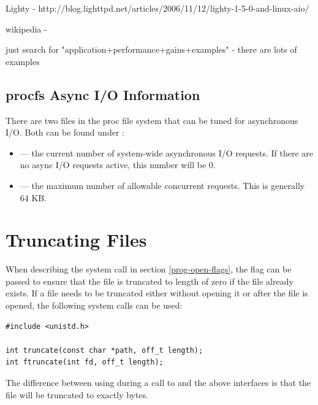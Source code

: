 Lighty - http://blog.lighttpd.net/articles/2006/11/12/lighty-1-5-0-and-linux-aio/ 

wikipedia - %

just search for "application+performance+gains+examples" - there are lots of examples


\subsection{procfs Async I/O Information}

There are two files in the proc file system that can be tuned for asynchronous I/O. Both can be found under :

\begin{itemize}
	\item {} --- the current number of system-wide asynchronous I/O requests. If there are no
		async I/O requests active, this number will be 0.
	\item {} --- the maximum number of allowable concurrent requests. This is generally 64 KB.
\end{itemize}


\section{Truncating Files}\label{prog-truncate}

When describing the  system call in section \ref{prog-open-flags}, the  flag can be passed to ensure that the file is truncated to length of zero if the file already exists. If a file needs to be truncated either without opening it or after the file is opened, the following system calls can be used:

\begin{lstlisting}
#include <unistd.h>

int truncate(const char *path, off_t length);
int ftruncate(int fd, off_t length);
\end{lstlisting}

\noindent
The difference between using  during a call to  and the above interfaces is that the file will be truncated to exactly  bytes.

